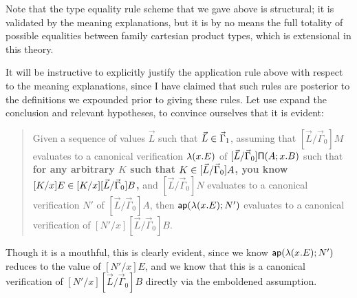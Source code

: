 \documentclass[main.tex]{subfiles}
\begin{document}
Note that the type equality rule scheme that we gave above is structural; it is
validated by the meaning explanations, but it is by no means the full totality
of possible equalities between family cartesian product types, which is
extensional in this theory.

It will be instructive to explicitly justify the application rule above with
respect to the meaning explanations, since I have claimed that such rules are
posterior to the definitions we expounded prior to giving these rules. Let use
expand the conclusion and relevant hypotheses, to convince ourselves that it is
evident:

\begin{quote}

  Given a sequence of values $\vec{L}$ such that
  $\vec{L}\in\vec\Gamma_1$, assuming that $[\vec{L}/\vec\Gamma_0]M$
  evaluates to a canonical verification $\mathsf{\lambda}(x.E)$ of
  $[\vec{L}/\vec\Gamma_0]\mathsf{\Pi}(A;x.B)$ such that \textbf{for any
  arbitrary $K$ such that $K\in[\vec{L}/\vec\Gamma_0]A$, you know
  $[K/x]E\in[K/x][\vec{L}/\vec\Gamma_0]B$,} and
  $[\vec{L}/\vec\Gamma_0]N$ evaluates to a canonical verification $N'$
  of $[\vec{L}/\vec\Gamma_0]A$, then $\mathsf{ap}(\mathsf{\lambda}(x.E);N')$ evaluates to
  a canonical verification of $[N'/x][\vec{L}/\vec\Gamma_0]B$.

\end{quote}

Though it is a mouthful, this is clearly evident, since we know
$\mathsf{ap}(\mathsf{\lambda}(x.E);N')$ reduces to the value of $[N'/x]E$, and we know that this is
a canonical verification of $[N'/x][\vec{L}/\vec\Gamma_0]B$ directly via the
emboldened assumption.
\end{document}
